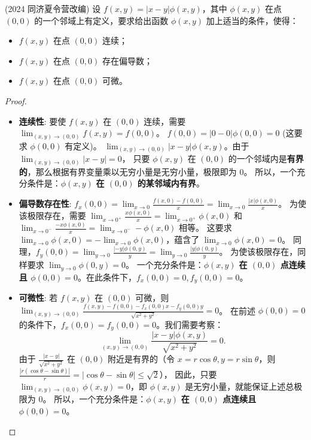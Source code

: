 \documentclass[lang=cn,10pt,thmcnt=section]{elegantbook}
\begin{document}
\begin{example}
    (2024 同济夏令营改编) 设 $f(x, y) = |x - y| \phi(x, y)$，其中 $\phi(x, y)$ 在点 $(0, 0)$ 的一个邻域上有定义，要求给出函数 $\phi(x, y)$ 加上适当的条件，使得：
\begin{itemize}
\item $f(x, y)$ 在点 $(0, 0)$ 连续；
\item $f(x, y)$ 在点 $(0, 0)$ 存在偏导数；
\item $f(x, y)$ 在点 $(0, 0)$ 可微。
\end{itemize}
\end{example}
\begin{proof}
\begin{itemize}
    \item \textbf{连续性}:
    要使 $f(x,y)$ 在 $(0,0)$ 连续，需要 $\lim_{(x,y)\to(0,0)} f(x,y) = f(0,0)$。
    $f(0,0) = |0-0|\phi(0,0) = 0$ (这要求 $\phi(0,0)$ 有定义)。
    $\lim_{(x,y)\to(0,0)} |x-y|\phi(x,y)$。由于 $\lim_{(x,y)\to(0,0)}|x-y|=0$，
    只要 $\phi(x,y)$ 在 $(0,0)$ 的一个邻域内是\textbf{有界的}，那么根据有界变量乘以无穷小量是无穷小量，极限即为 $0$。
    所以，一个充分条件是：$\phi(x,y)$ \textbf{在 $(0,0)$ 的某邻域内有界}。
    
    \item \textbf{偏导数存在性}:
    $f_x(0,0) = \lim_{x\to 0} \frac{f(x,0)-f(0,0)}{x} = \lim_{x\to 0} \frac{|x|\phi(x,0)}{x}$。
    为使该极限存在，需要 $\lim_{x\to 0^+} \frac{x\phi(x,0)}{x} = \lim_{x\to 0^+} \phi(x,0)$ 和 $\lim_{x\to 0^-} \frac{-x\phi(x,0)}{x} = \lim_{x\to 0^-} -\phi(x,0)$ 相等。
    这要求 $\lim_{x\to 0} \phi(x,0) = -\lim_{x\to 0} \phi(x,0)$，蕴含了 $\lim_{x\to 0} \phi(x,0) = 0$。
    同理，$f_y(0,0) = \lim_{y\to 0} \frac{|-y|\phi(0,y)}{y} = \lim_{y\to 0} \frac{|y|\phi(0,y)}{y}$。
    为使该极限存在，同样要求 $\lim_{y\to 0} \phi(0,y) = 0$。
    一个充分条件是：$\phi(x,y)$ \textbf{在 $(0,0)$ 点连续且 $\phi(0,0)=0$}。在此条件下，$f_x(0,0)=0, f_y(0,0)=0$。

    \item \textbf{可微性}:
    若 $f(x,y)$ 在 $(0,0)$ 可微，则 $\lim_{(x,y)\to(0,0)} \frac{f(x,y) - f(0,0) - f_x(0,0)x - f_y(0,0)y}{\sqrt{x^2+y^2}} = 0$。
    在前述 $\phi(0,0)=0$ 的条件下，$f_x(0,0)=f_y(0,0)=0$。我们需要考察：
    \[
    \lim_{(x,y)\to(0,0)} \frac{|x-y|\phi(x,y)}{\sqrt{x^2+y^2}} = 0.
    \]
    由于 $\frac{|x-y|}{\sqrt{x^2+y^2}}$ 在 $(0,0)$ 附近是有界的（令 $x=r\cos\theta, y=r\sin\theta$，则 $\frac{|r(\cos\theta-\sin\theta)|}{r} = |\cos\theta-\sin\theta| \le \sqrt{2}$），
    因此，只要 $\lim_{(x,y)\to(0,0)} \phi(x,y) = 0$，即 $\phi(x,y)$ 是无穷小量，就能保证上述总极限为 $0$。
    所以，一个充分条件是：$\phi(x,y)$ \textbf{在 $(0,0)$ 点连续且 $\phi(0,0)=0$}。
\end{itemize}
\end{proof}
\end{document}
